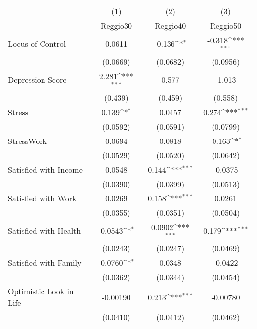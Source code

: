 {
\def\sym#1{\ifmmode^{#1}\else\(^{#1}\)\fi}
\begin{tabular}{l*{3}{c}}
\hline\hline
            &\multicolumn{1}{c}{(1)}&\multicolumn{1}{c}{(2)}&\multicolumn{1}{c}{(3)}\\
            &\multicolumn{1}{c}{Reggio30}&\multicolumn{1}{c}{Reggio40}&\multicolumn{1}{c}{Reggio50}\\
\hline
Locus of Control&      0.0611         &      -0.136\sym{*}  &      -0.318\sym{***}\\
            &    (0.0669)         &    (0.0682)         &    (0.0956)         \\
[1em]
Depression Score&       2.281\sym{***}&       0.577         &      -1.013         \\
            &     (0.439)         &     (0.459)         &     (0.558)         \\
[1em]
Stress      &       0.139\sym{*}  &      0.0457         &       0.274\sym{***}\\
            &    (0.0592)         &    (0.0591)         &    (0.0799)         \\
[1em]
StressWork  &      0.0694         &      0.0818         &      -0.163\sym{*}  \\
            &    (0.0529)         &    (0.0520)         &    (0.0642)         \\
[1em]
Satisfied with Income&      0.0548         &       0.144\sym{***}&     -0.0375         \\
            &    (0.0390)         &    (0.0399)         &    (0.0513)         \\
[1em]
Satisfied with Work&      0.0269         &       0.158\sym{***}&      0.0261         \\
            &    (0.0355)         &    (0.0351)         &    (0.0504)         \\
[1em]
Satisfied with Health&     -0.0543\sym{*}  &      0.0902\sym{***}&       0.179\sym{***}\\
            &    (0.0243)         &    (0.0247)         &    (0.0469)         \\
[1em]
Satisfied with Family&     -0.0760\sym{*}  &      0.0348         &     -0.0422         \\
            &    (0.0362)         &    (0.0344)         &    (0.0454)         \\
[1em]
Optimistic Look in Life&    -0.00190         &       0.213\sym{***}&    -0.00780         \\
            &    (0.0410)         &    (0.0412)         &    (0.0462)         \\

\end{tabular}}
